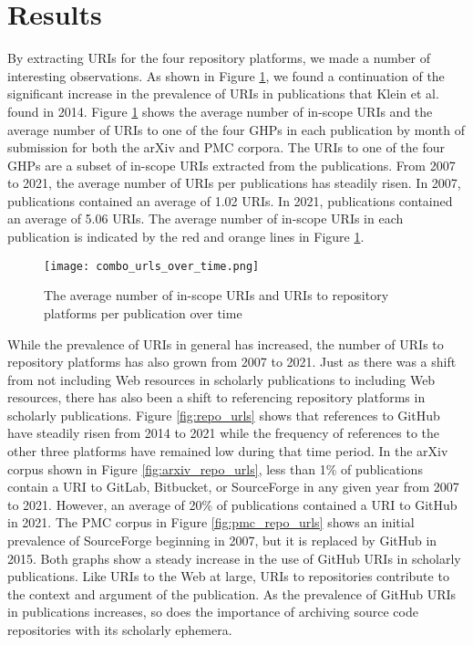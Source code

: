 \section{Results}
By extracting URIs for the four repository platforms, we made a number of interesting observations. As shown in Figure \ref{fig:combo_urls}, we found a continuation of the significant increase in the prevalence of URIs in publications that Klein et al. \cite{klein-plos2014} found in 2014. Figure \ref{fig:combo_urls} shows the average number of in-scope URIs and the average number of URIs to one of the four GHPs in each publication by month of submission for both the arXiv and PMC corpora. The URIs to one of the four GHPs are a subset of in-scope URIs extracted from the publications. From 2007 to 2021, the average number of URIs per publications has steadily risen. In 2007, publications contained an average of 1.02 URIs. In 2021, publications contained an average of 5.06 URIs. The average number of in-scope URIs in each publication is indicated by the red and orange lines in Figure \ref{fig:combo_urls}. 

\begin{figure}
    \centering
    \texttt{[image: combo\_urls\_over\_time.png]}
    \caption{The average number of in-scope URIs and URIs to repository platforms per publication over time}
    \label{fig:combo_urls}
\end{figure}

While the prevalence of URIs in general has increased, the number of URIs to repository platforms has also grown from 2007 to 2021. Just as there was a shift from not including Web resources in scholarly publications to including Web resources, there has also been a shift to referencing repository platforms in scholarly publications. Figure \ref{fig:repo_urls} shows that references to GitHub have steadily risen from 2014 to 2021 while the frequency of references to the other three platforms have remained low during that time period. In the arXiv corpus shown in Figure \ref{fig:arxiv_repo_urls}, less than 1\% of publications contain a URI to GitLab, Bitbucket, or SourceForge in any given year from 2007 to 2021. However, an average of 20\% of publications contained a URI to GitHub in 2021. The PMC corpus in Figure \ref{fig:pmc_repo_urls} shows an initial prevalence of SourceForge beginning in 2007, but it is replaced by GitHub in 2015. Both graphs show a steady increase in the use of GitHub URIs in scholarly publications. Like URIs to the Web at large, URIs to repositories contribute to the context and argument of the publication. As the prevalence of GitHub URIs in publications increases, so does the importance of archiving source code repositories with its scholarly ephemera.

